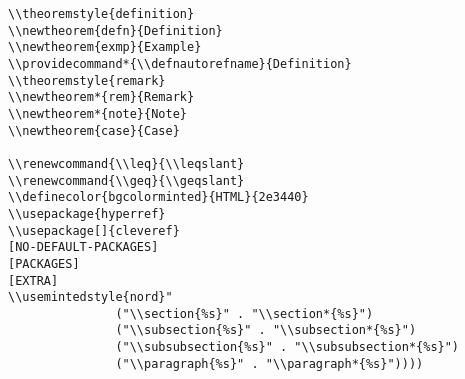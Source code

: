 \documentclass[c]{article}
\theoremstyle{plain}%
\theoremstyle{definition}
\providecommand*{\defnautorefname}{Definition}
\theoremstyle{remark}
\renewcommand{\leq}{\leqslant}
\renewcommand{\geq}{\geqslant}
\begin{document}
\begin{verbatim}
\\theoremstyle{definition}
\\newtheorem{defn}{Definition}
\\newtheorem{exmp}{Example}
\\providecommand*{\\defnautorefname}{Definition}
\\theoremstyle{remark}
\\newtheorem*{rem}{Remark}
\\newtheorem*{note}{Note}
\\newtheorem{case}{Case}

\\renewcommand{\\leq}{\\leqslant}
\\renewcommand{\\geq}{\\geqslant}
\\definecolor{bgcolorminted}{HTML}{2e3440}
\\usepackage{hyperref}
\\usepackage[]{cleveref}
[NO-DEFAULT-PACKAGES]
[PACKAGES]
[EXTRA]
\\usemintedstyle{nord}"
               ("\\section{%s}" . "\\section*{%s}")
               ("\\subsection{%s}" . "\\subsection*{%s}")
               ("\\subsubsection{%s}" . "\\subsubsection*{%s}")
               ("\\paragraph{%s}" . "\\paragraph*{%s}"))))
\end{verbatim}
\end{document}
